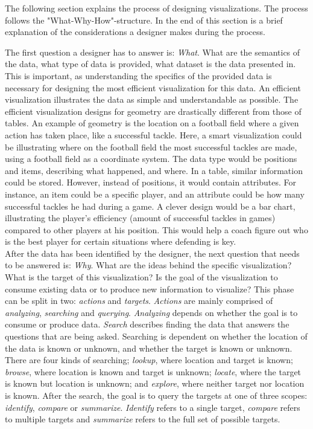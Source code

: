 \documentclass[Report.tex]{subfiles}
\begin{document}
The following section explains the process of designing visualizations. The process follows the "What-Why-How"-structure. In the end of this section is a brief explanation of the considerations a designer makes during the process.

The first question a designer has to answer is: \emph{What}. What are the semantics of the data, what type of data is provided, what dataset is the data presented in. This is important, as understanding the specifics of the provided data is necessary for designing the most efficient visualization for this data. An efficient visualization illustrates the data as simple and understandable as possible. The efficient visualization designs for geometry are drastically different from those of tables. An example of geometry is the location on a football field where a given action has taken place, like a successful tackle. Here, a smart visualization could be illustrating where on the football field the most successful tackles are made, using a football field as a coordinate system. The data type would be positions and items, describing what happened, and where. In a table, similar information could be stored. However, instead of positions, it would contain attributes. For instance, an item could be a specific player, and an attribute could be how many successful tackles he had during a game. A clever design would be a bar chart, illustrating the player’s efficiency (amount of successful tackles in games) compared to other players at his position. This would help a coach figure out who is the best player for certain situations where defending is key.\\
After the data has been identified by the designer, the next question that needs to be answered is: \emph{Why}. What are the ideas behind the specific visualization? What is the target of this visualization? Is the goal of the visualization to consume existing data or to produce new information to visualize? This phase can be split in two: \emph{actions} and \emph{targets}. \emph{Actions} are mainly comprised of \emph{analyzing}, \emph{searching} and \emph{querying}. \emph{Analyzing} depends on whether the goal is to consume or produce data. \emph{Search} describes finding the data that answers the questions that are being asked. Searching is dependent on whether the location of the data is known or unknown, and whether the target is known or unknown. There are four kinds of searching; \emph{lookup}, where location and target is known; \emph{browse}, where location is known and target is unknown; \emph{locate}, where the target is known but location is unknown; and \emph{explore}, where neither target nor location is known. After the search, the goal is to query the targets at one of three scopes: \emph{identify}, \emph{compare} or \emph{summarize}. \emph{Identify} refers to a single target, \emph{compare} refers to multiple targets and \emph{summarize} refers to the full set of possible targets.
\end{document}
